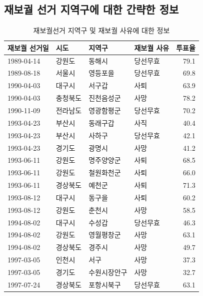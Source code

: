 \documentclass[
  11pt,
  letter]{article}
\begin{document}
\hypertarget{uxc7acuxbcf4uxad90-uxc120uxac70-uxc9c0uxc5eduxad6cuxc5d0-uxb300uxd55c-uxac04uxb7b5uxd55c-uxc815uxbcf4}{%
\subsection{재보궐 선거 지역구에 대한 간략한
정보}\label{uxc7acuxbcf4uxad90-uxc120uxac70-uxc9c0uxc5eduxad6cuxc5d0-uxb300uxd55c-uxac04uxb7b5uxd55c-uxc815uxbcf4}}

\begin{longtable}[t]{l|l|l|l|r}
\caption{\label{tab:unnamed-chunk-24}재보궐선거 지역구 및 재보궐 사유에 대한 정보}\\
\hline
재보궐 선거일 & 시도 & 지역구 & 재보궐 사유 & 투표율\\
\hline
1989-04-14 & 강원도 & 동해시 & 당선무효 & 79.1\\
\hline
1989-08-18 & 서울시 & 영등포을 & 당선무효 & 69.8\\
\hline
1990-04-03 & 대구시 & 서구갑 & 사퇴 & 63.9\\
\hline
1990-04-03 & 충청북도 & 진천음성군 & 사망 & 78.2\\
\hline
1990-11-09 & 전라남도 & 영광함평군 & 당선무효 & 70.2\\
\hline
1993-04-23 & 부산시 & 동래구갑 & 사직 & 40.4\\
\hline
1993-04-23 & 부산시 & 사하구 & 당선무효 & 42.1\\
\hline
1993-04-23 & 경기도 & 광명시 & 사망 & 41.2\\
\hline
1993-06-11 & 강원도 & 명주양양군 & 사퇴 & 68.5\\
\hline
1993-06-11 & 강원도 & 철원화천군 & 사퇴 & 66.0\\
\hline
1993-06-11 & 경상북도 & 예천군 & 사퇴 & 71.3\\
\hline
1993-08-12 & 대구시 & 동구을 & 사퇴 & 60.2\\
\hline
1993-08-12 & 강원도 & 춘천시 & 사망 & 58.5\\
\hline
1994-08-02 & 대구시 & 수성갑 & 당선무효 & 46.3\\
\hline
1994-08-02 & 강원도 & 영월평창군 & 사망 & 63.1\\
\hline
1994-08-02 & 경상북도 & 경주시 & 사망 & 49.7\\
\hline
1997-03-05 & 인천시 & 서구 & 사망 & 37.3\\
\hline
1997-03-05 & 경기도 & 수원시장안구 & 사망 & 32.7\\
\hline
1997-07-24 & 경상북도 & 포항시북구 & 당선무효 & 63.1\\
\hline

\end{longtable}
\end{document}
